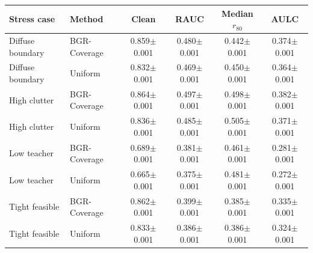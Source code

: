 \begin{tabular}{llcccc}
\hline
Stress case & Method & Clean & RAUC & Median $r_{80}$ & AULC \\
\hline
Diffuse boundary & BGR-Coverage & 0.859$\pm$0.001 & 0.480$\pm$0.001 & 0.442$\pm$0.001 & 0.374$\pm$0.001 \\
Diffuse boundary & Uniform & 0.832$\pm$0.001 & 0.469$\pm$0.001 & 0.450$\pm$0.001 & 0.364$\pm$0.001 \\
High clutter & BGR-Coverage & 0.864$\pm$0.001 & 0.497$\pm$0.001 & 0.498$\pm$0.001 & 0.382$\pm$0.001 \\
High clutter & Uniform & 0.836$\pm$0.001 & 0.485$\pm$0.001 & 0.505$\pm$0.001 & 0.371$\pm$0.001 \\
Low teacher & BGR-Coverage & 0.689$\pm$0.001 & 0.381$\pm$0.001 & 0.461$\pm$0.001 & 0.281$\pm$0.001 \\
Low teacher & Uniform & 0.665$\pm$0.001 & 0.375$\pm$0.001 & 0.481$\pm$0.001 & 0.272$\pm$0.001 \\
Tight feasible & BGR-Coverage & 0.862$\pm$0.001 & 0.399$\pm$0.001 & 0.385$\pm$0.001 & 0.335$\pm$0.001 \\
Tight feasible & Uniform & 0.833$\pm$0.001 & 0.386$\pm$0.001 & 0.386$\pm$0.001 & 0.324$\pm$0.001 \\
\hline
\end{tabular}
